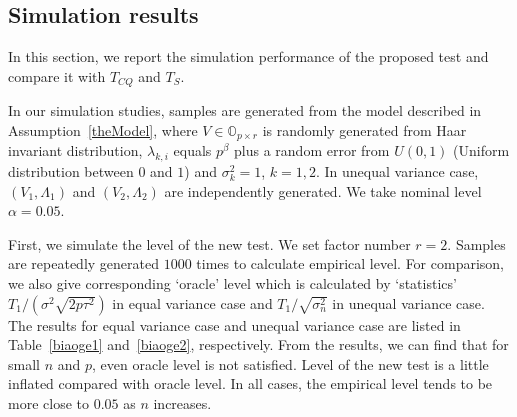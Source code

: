 \documentclass[review]{elsarticle}
\theoremstyle{plain}
\theoremstyle{definition}
\theoremstyle{remark}
\begin{document}
\subsection{Simulation results}


In this section, we report the simulation performance of the proposed test and compare it with $T_{CQ}$ and $T_S$.

In our simulation studies, samples are generated from the model described in Assumption~\ref{theModel},   
    where $V\in\mathbb{O}_{p\times r}$ is randomly generated from Haar invariant distribution, $\lambda_{k,i}$ equals $p^{\beta}$ plus a random error from $U(0,1)$ (Uniform distribution between $0$ and $1$) and $\sigma^2_k=1$, $k=1,2$.
    In unequal variance case, $(V_1,\Lambda_1)$ and $(V_2,\Lambda_2)$ are independently generated.
We take nominal level $\alpha=0.05$.


First, we simulate the level of the new test. We set factor number $r=2$.
Samples are repeatedly generated $1000$ times to calculate empirical level.
For comparison, we also give corresponding `oracle' level which is calculated by `statistics' ${T_1}/(\sigma^2\sqrt{2p\tau^2})$ in equal variance case and ${T_1}/\sqrt{\sigma_n^2}$ in unequal variance case.
The results for equal variance case and unequal variance case are listed in
Table~\ref{biaoge1} and~\ref{biaoge2}, respectively.
From the results, we can find that for small $n$ and $p$, even oracle level is not satisfied.
Level of the new test is a little inflated compared with oracle level.
In all cases, the empirical level tends to be more close to $0.05$ as $n$ increases.
\end{document}

